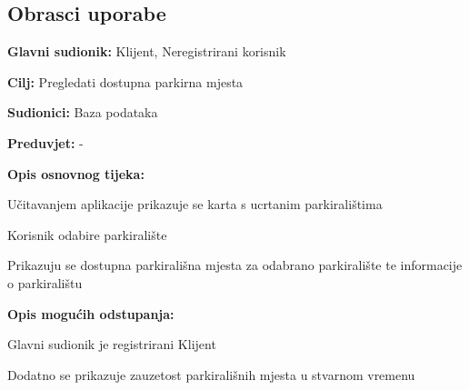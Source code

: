 \eject 



\subsection{Obrasci uporabe}




\noindent {}
\begin{packed_item}
	
	\item \textbf{Glavni sudionik: }Klijent, Neregistrirani korisnik
	\item  \textbf{Cilj:} Pregledati dostupna parkirna mjesta
	\item  \textbf{Sudionici:} Baza podataka
	\item  \textbf{Preduvjet:} -
	\item  \textbf{Opis osnovnog tijeka:}
	
	\item[] \begin{packed_enum}
		
		
		\item Učitavanjem aplikacije prikazuje se karta s ucrtanim parkiralištima
		\item Korisnik odabire parkiralište
		\item Prikazuju se dostupna parkirališna mjesta za odabrano parkiralište te informacije o parkiralištu
		
	\end{packed_enum}
	
	\item  \textbf{Opis mogućih odstupanja:}
	
	\item[] \begin{packed_item}
		
		\item[3.a] Glavni sudionik je registrirani Klijent
		\item[] \begin{packed_enum}
			
			\item Dodatno se prikazuje zauzetost parkirališnih mjesta u stvarnom vremenu
			
			
		\end{packed_enum}
		
		
	\end{packed_item}	
\end{packed_item}

